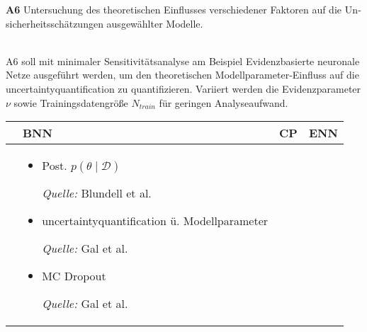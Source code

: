 \begin{otherlanguage}{ngerman}
\textbf{A6} Untersuchung des theoretischen Einflusses verschiedener Faktoren auf die Unsicherheitsschätzungen ausgewählter Modelle.
\par\noindent\\

A6 soll mit minimaler Sensitivitätsanalyse am Beispiel \gls{Evidenzbasierte neuronale Netze} ausgeführt werden, um den theoretischen Modellparameter-Einfluss auf die \gls{uncertaintyquantification} zu quantifizieren. Variiert werden die Evidenzparameter $\nu$ sowie Trainingsdatengröße $N_{train}$ für geringen Analyseaufwand.



\begin{table}[!htpb]
  \centering
  \footnotesize
  \begin{tabularx}{\textwidth}{|>{\centering\arraybackslash}l|X|X|X|}
    \hline
    & \hspace{0.6em}\textbf{BNN} 
    & \hspace{0.6em}\textbf{CP} 
    & \hspace{0.6em}\textbf{ENN} \\
    \hline

    \multirow{7}{*}{\textbf{A}} & 
    \begin{minipage}[t]{\linewidth}
    \vspace{0.3em}
    \begin{itemize}[leftmargin=*, label={}, itemsep=0.125em, topsep=0em, parsep=0em]
        \item Post. \( p(\theta \mid \mathcal{D}) \) \par
        \begin{scriptsize}\textit{Quelle:} Blundell et al. \parencite*[Kap.~3]{blundell2015weight}\end{scriptsize}
        \item \gls{uncertaintyquantification} ü. Modellparameter \par
        \begin{scriptsize}\textit{Quelle:} Gal et al. \parencite*[S.~40–42]{gal2016uncertainty}\end{scriptsize}
        \item MC Dropout \par
        \begin{scriptsize}\textit{Quelle:} Gal et al. \parencite*[S.~40–42]{gal2016uncertainty}\end{scriptsize}
    \end{itemize}
    \vspace{0.3em}
    \end{minipage} &


\end{tabularx}
\end{table}
\end{otherlanguage}
